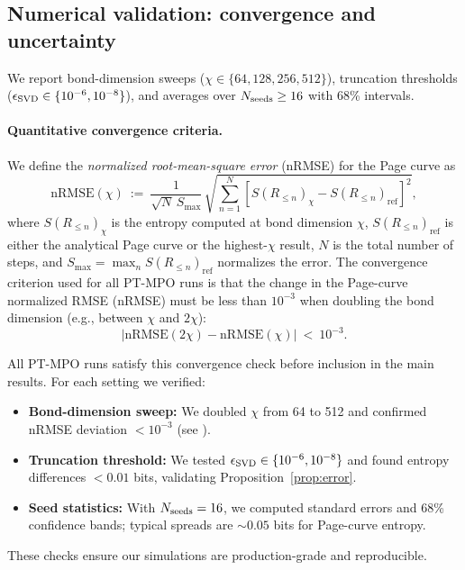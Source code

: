 \documentclass[a4paper,11pt]{article}
\newcommand{\eg}{e.g.\xspace}
\theoremstyle{plain}
\theoremstyle{definition}
\theoremstyle{remark}
\begin{document}
\subsection*{Numerical validation: convergence and uncertainty}
We report bond-dimension sweeps ($\chi\in\{64,128,256,512\}$), truncation thresholds
($\epsilon_{\rm SVD}\in\{10^{-6},10^{-8}\}$), and averages over $N_{\rm seeds}\ge 16$ with 68\% intervals.

\paragraph{Quantitative convergence criteria.}
We define the \emph{normalized root-mean-square error} (nRMSE) for the Page curve as
\begin{equation}
\mathrm{nRMSE}(\chi) \ :=\ \frac{1}{\sqrt{N}\,S_{\max}}\,\sqrt{\sum_{n=1}^N\left[S(R_{\le n})_{\chi} - S(R_{\le n})_{\mathrm{ref}}\right]^2},
\end{equation}
where $S(R_{\le n})_{\chi}$ is the entropy computed at bond dimension $\chi$, $S(R_{\le n})_{\mathrm{ref}}$ is either the analytical Page curve or the highest-$\chi$ result, $N$ is the total number of steps, and $S_{\max}=\max_n S(R_{\le n})_{\mathrm{ref}}$ normalizes the error. The convergence criterion used for all PT-MPO runs is that the change in the Page-curve normalized RMSE (nRMSE) must be less than $10^{-3}$ when doubling the bond dimension (\eg, between $\chi$ and $2\chi$):
\begin{equation}
\left|\mathrm{nRMSE}(2\chi) - \mathrm{nRMSE}(\chi)\right| \ <\ 10^{-3}.
\end{equation}

All PT-MPO runs satisfy this convergence check before inclusion in the main results. For each setting we verified:
\begin{itemize}[leftmargin=*]
  \item \textbf{Bond-dimension sweep:} We doubled $\chi$ from 64 to 512 and confirmed nRMSE deviation $<10^{-3}$ (see ).
  \item \textbf{Truncation threshold:} We tested $\epsilon_{\rm SVD}\in\{10^{-6},10^{-8}\}$ and found entropy differences $<0.01$ bits, validating Proposition~\ref{prop:error}.
  \item \textbf{Seed statistics:} With $N_{\rm seeds}=16$, we computed standard errors and 68\% confidence bands; typical spreads are $\sim 0.05$ bits for Page-curve entropy.
\end{itemize}
These checks ensure our simulations are production-grade and reproducible.
\end{document}
